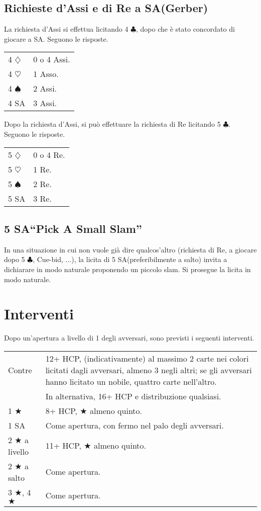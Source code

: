 \documentclass[a4paper,10pt]{article}
\renewcommand{\c}{$\clubsuit$\xspace}
\renewcommand{\d}{$\diamondsuit$\xspace}
\newcommand{\h}{$\heartsuit$\xspace}
\newcommand{\s}{$\spadesuit$\xspace}
\renewcommand{\j}{$\bigstar$\xspace}
\newcommand{\sa}{SA\xspace}
\newcommand{\smallspace}{\vskip0.3cm}
\newenvironment{twocol}
  {\smallspace\noindent\begin{tabular}{l p{0.78\textwidth}}}
  {\end{tabular}\smallspace}
\begin{document}
\subsection{Richieste d'Assi e di Re a \sa (Gerber)}

La richiesta d'Assi si effettua licitando 4 \c, dopo che è stato concordato di giocare a \sa. Seguono le risposte.
\begin{twocol}
  4 \d & 0 o 4 Assi.\\
  4 \h & 1 Asso.\\
  4 \s & 2 Assi.\\
  4 \sa & 3 Assi.
\end{twocol}

Dopo la richiesta d'Assi, si può effettuare la richiesta di Re licitando 5 \c. Seguono le risposte.
\begin{twocol}
  5 \d & 0 o 4 Re.\\
  5 \h & 1 Re.\\
  5 \s & 2 Re.\\
  5 \sa & 3 Re.
\end{twocol}


\subsection{5 \sa ``Pick A Small Slam''}

In una situazione in cui non vuole già dire qualcos'altro (richiesta di Re, a giocare dopo 5 \c, Cue-bid, ...), la licita di 5 \sa (preferibilmente a salto) invita a dichiarare in modo naturale proponendo un piccolo slam. Si prosegue la licita in modo naturale.



\pagebreak
\section{Interventi}

Dopo un'apertura a livello di 1 degli avversari, sono previsti i seguenti interventi.

\begin{twocol}
  Contre & 12+ HCP, (indicativamente) al massimo 2 carte nei colori licitati dagli avversari, almeno 3 negli altri; se gli avversari hanno licitato un nobile, quattro carte nell'altro. \\
  & In alternativa, 16+ HCP e distribuzione qualsiasi.\\
  1 \j & 8+ HCP, \j almeno quinto.\\
  1 \sa & Come apertura, con fermo nel palo degli avversari.\\
  2 \j a livello & 11+ HCP, \j almeno quinto.\\
  2 \j a salto & Come apertura.\\
  3 \j, 4 \j & Come apertura.
\end{twocol}
\end{document}

